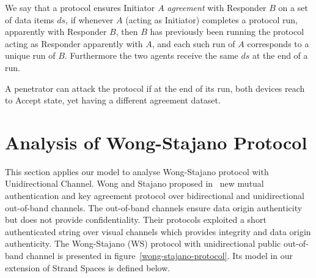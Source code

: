 \begin{Definition} We say that a protocol ensures Initiator $A$ \textit{agreement} with Responder $B$ on a set of data items $ds$, if whenever $A$ (acting as Initiator) completes a protocol run, apparently with Responder $B$, then $B$ has previously been running the protocol acting as Responder apparently with $A$, and each such run of $A$ corresponds to a unique run of $B$. Furthermore the two agents receive the same $ds$ at the end of a run. 
\end{Definition}

A penetrator can attack the protocol if at the end of its run, both devices reach to Accept state, yet having a different agreement dataset. 

\section{Analysis of Wong-Stajano Protocol}\label{analysisWSP}

This section applies our model to analyse Wong-Stajano protocol with Unidirectional Channel. Wong and Stajano proposed in~\cite{10.1109/MPRV.2007.76} new mutual authentication and key agreement protocol over bidirectional and unidirectional out-of-band channels. The out-of-band channels ensure data origin authenticity but does not provide confidentiality. Their protocols exploited a short authenticated string over visual channels which provides integrity and data origin authenticity. The Wong-Stajano (WS) protocol with unidirectional public out-of-band channel is presented in figure~\ref{wong-stajano-protocol}. Its model in our extension of Strand Spaces is defined below.

